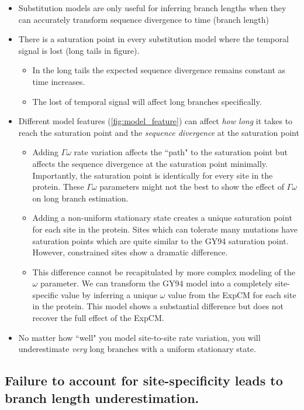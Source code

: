 \documentclass[11pt]{article}
\newcommand\skhcomment[1]{{\color{cyan}#1}}
\begin{document}
\begin{itemize}
\item Substitution models are only useful for inferring branch lengths when they can accurately transform sequence divergence to time (branch length)
\item There is a saturation point in every substitution model where the temporal signal is lost (long tails in figure). 
\begin{itemize}
\item In the long tails the expected sequence divergence remains constant as time increases. 
\item The lost of temporal signal will affect long branches specifically.
\end{itemize}
\item Different model features (\ref{fig:model_feature}) can affect \textit{how long} it takes to reach the saturation point and the \textit{sequence divergence} at the saturation point 
\begin{itemize}
\item Adding $\Gamma\omega$ rate variation affects the ``path" to the saturation point but affects the sequence divergence at the saturation point minimally. Importantly, the saturation point is identically for every site in the protein. \skhcomment{These $\Gamma\omega$ parameters might not the best to show the effect of $\Gamma\omega$ on long branch estimation.} 
\item Adding a non-uniform stationary state creates a unique saturation point for each site in the protein. Sites which can tolerate many mutations have saturation points which are quite similar to the GY94 saturation point. However, constrained sites show a dramatic difference. 
\item This difference cannot be recapitulated by more complex modeling of the $\omega$ parameter. We can transform the GY94 model into a completely site-specific value by inferring a unique $\omega$ value from the ExpCM for each site in the protein. This model shows a substantial difference but does not recover the full effect of the ExpCM. 
\end{itemize}
\item No matter how ``well" you model site-to-site rate variation, you will underestimate \textit{very} long branches with a uniform stationary state. 
\end{itemize}

\subsection*{Failure to account for site-specificity leads to branch length underestimation.}
\end{document}
